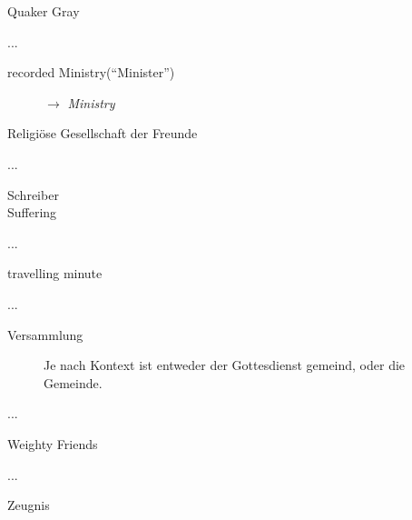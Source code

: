 \begin{description}
\begin{description}
 \item[Quaker Gray]
 \end{description}
 \item[R]...
\begin{description}
 \item[recorded Ministry("`Minister"')] $\to$ \textit{Ministry}
 \item[Religiöse Gesellschaft der Freunde]
 \end{description}
 \item[S]...
\begin{description}
 \item[Schreiber]
 \item[Suffering]
 \end{description}
 \item[T]...
\begin{description}
 \item[travelling minute]
 \end{description}
 \item[V]...
\begin{description}
 \item[Versammlung] Je nach Kontext ist entweder der Gottesdienst gemeind, oder die Gemeinde.
 \end{description}
 \item[W]...
\begin{description}
 \item[Weighty Friends]
 \end{description}
 \item[Z]...
\begin{description}
 \item[Zeugnis]
 \end{description}
 \end{description}

